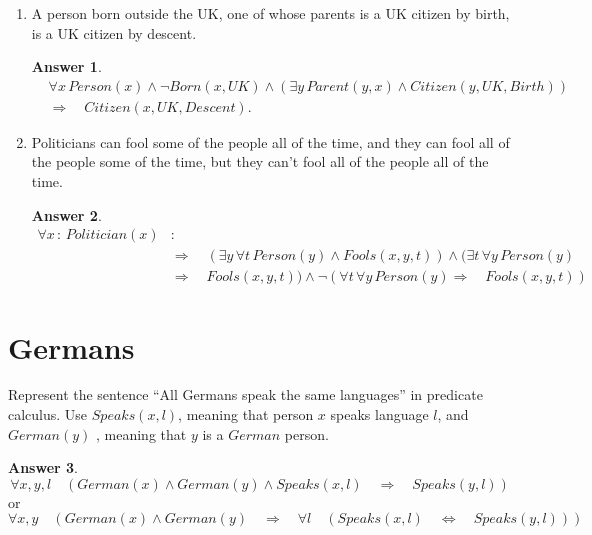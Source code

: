 \documentclass[a4paper]{article}
\renewcommand{\(}{\left(}
\renewcommand{\)}{\right)}
\theoremstyle{plain}
\theoremstyle{plain}
\theoremstyle{definition}
\newtheorem*{answer}{Answer}
\begin{document}
\begin{enumerate}[label*=\alph*.,ref=\alph*]
\item A person born outside the UK, one of whose parents is a UK citizen by birth, is a UK citizen by descent.
\begin{shaded}
\begin{answer}
\begin{align*}
&\forall x \, Person(x) \wedge \neg Born(x,UK) \wedge (\exists y \, Parent(y, x) \wedge Citizen(y,UK,Birth)) \\
& \Rightarrow \quad Citizen(x,UK,Descent).
\end{align*}
\end{answer}
\end{shaded}

\item Politicians can fool some of the people all of the time, and they can fool all of the people some of the time, but they can't fool all of the people all of the time.
\begin{shaded}
\begin{answer}
\begin{align*}
  \forall x \, : \, Politician(x) & : \\
   &\Rightarrow \quad (\exists y \, \forall t \, Person(y) \wedge Fools(x, y, t)) \wedge (\exists t \, \forall y \, Person(y) \\
  & \Rightarrow \quad Fools(x, y, t)) \wedge \neg (\forall t \, \forall y \, Person(y) \Rightarrow \quad Fools(x, y, t))
\end{align*}
\end{answer}
\end{shaded}


\end{enumerate}
\section{Germans}
 Represent the sentence ``All Germans speak the same
languages'' in predicate calculus. Use $Speaks(x,l)$, meaning that person $x$ speaks
language $l$, and $German(y)$ , meaning that $y$ is a $German$ person.
\begin{shaded}
\begin{answer}
\begin{equation*}
  \forall x , y , l \quad \left(German(x) \wedge German(y) \wedge Speaks (x,l) \quad \Rightarrow \quad Speaks(y,l) \right)
\end{equation*}
or
\begin{equation*}
  \forall x , y \quad \left(German(x) \wedge German(y)   \quad \Rightarrow \quad \forall l \quad (Speaks (x,l) \quad \Leftrightarrow \quad Speaks(y,l)) \right)
\end{equation*}

\end{answer}
\end{shaded}
\end{document}
